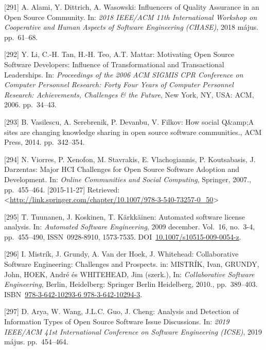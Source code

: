 \documentclass[12pt,magyar,a4paper,oneside]{scrreprt}
\newenvironment{cslreferences}%
  {}%
  {\par}
\begin{document}
\begin{cslreferences}
\leavevmode\hypertarget{ref-alami_influencers_2018}{}%
{[}291{]} A. Alami, Y. Dittrich, A. Wasowski: Influencers of Quality
Assurance in an Open Source Community. In: \emph{2018 IEEE/ACM 11th
International Workshop on Cooperative and Human Aspects of Software
Engineering (CHASE)}, 2018 május. pp.~61--68.

\leavevmode\hypertarget{ref-li_motivating_2006}{}%
{[}292{]} Y. Li, C.-H. Tan, H.-H. Teo, A.T. Mattar: Motivating Open
Source Software Developers: Influence of Transformational and
Transactional Leaderships. In: \emph{Proceedings of the 2006 ACM SIGMIS
CPR Conference on Computer Personnel Research: Forty Four Years of
Computer Personnel Research: Achievements, Challenges \& the Future},
New York, NY, USA: ACM, 2006. pp.~34--43.

\leavevmode\hypertarget{ref-vasilescu_how_2014}{}%
{[}293{]} B. Vasilescu, A. Serebrenik, P. Devanbu, V. Filkov: How social
Q\&amp;A sites are changing knowledge sharing in open source software
communities., ACM Press, 2014. pp.~342--354.

\leavevmode\hypertarget{ref-viorres_major_2007}{}%
{[}294{]} N. Viorres, P. Xenofon, M. Stavrakis, E. Vlachogiannis, P.
Koutsabasis, J. Darzentas: Major HCI Challenges for Open Source Software
Adoption and Development. In: \emph{Online Communities and Social
Computing}, Springer, 2007., pp.~455--464. {[}2015-11-27{]} Retrieved:
\textless{}\url{http://link.springer.com/chapter/10.1007/978-3-540-73257-0_50}\textgreater{}

\leavevmode\hypertarget{ref-tuunanen_automated_2009}{}%
{[}295{]} T. Tuunanen, J. Koskinen, T. Kärkkäinen: Automated software
license analysis. In: \emph{Automated Software Engineering}, 2009
december. Vol.~16, no.~3-4, pp.~455--490, ISSN~0928-8910, 1573-7535.
DOI~\href{https://doi.org/10.1007/s10515-009-0054-z}{10.1007/s10515-009-0054-z}.

\leavevmode\hypertarget{ref-mistrik_collaborative_2010}{}%
{[}296{]} I. Mistrík, J. Grundy, A. Van der Hoek, J. Whitehead:
Collaborative Software Engineering: Challenges and Prospects. in:
MISTRÍK, Ivan, GRUNDY, John, HOEK, André és WHITEHEAD, Jim (szerk.), In:
\emph{Collaborative Software Engineering}, Berlin, Heidelberg: Springer
Berlin Heidelberg, 2010., pp.~389--403.
ISBN~\href{https://worldcat.org/isbn/978-3-642-10293-6\%20978-3-642-10294-3}{978-3-642-10293-6 978-3-642-10294-3}.

\leavevmode\hypertarget{ref-arya_analysis_2019}{}%
{[}297{]} D. Arya, W. Wang, J.L.C. Guo, J. Cheng: Analysis and Detection
of Information Types of Open Source Software Issue Discussions. In:
\emph{2019 IEEE/ACM 41st International Conference on Software
Engineering (ICSE)}, 2019 május. pp.~454--464.


\end{cslreferences}
\end{document}
